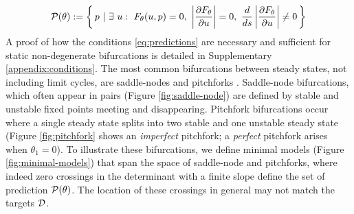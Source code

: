 \documentclass{article}
\begin{document}
\begin{align}
	\mathcal{P}(\theta):=\left\{\,
	p\,\,|\,\,\exists\,\,u:\,\,F_{\theta}(u,p)=0,\,\,\left| \frac{\partial F_{\theta}}{\partial u} \right|=0,
	\,\, \frac{d}{ds}\left| \frac{\partial F_{\theta}}{\partial u} \right|\neq0
	\,\right\}
	\label{eq:predictions}
\end{align}
A proof of how the conditions \eqref{eq:predictions} are necessary and sufficient for static non-degenerate bifurcations is detailed in Supplementary \ref{appendix:conditions}. The most common bifurcations between steady states, not including limit cycles, are saddle-nodes and pitchforks \cite{Haragus2011LocalSystems}. Saddle-node bifurcations, which often appear in pairs (Figure \ref{fig:saddle-node}) are defined by stable and unstable fixed points meeting and disappearing. Pitchfork bifurcations occur where a single steady state splits into two stable and one unstable steady state (Figure \ref{fig:pitchfork} shows an \textit{imperfect} pitchfork; a \textit{perfect} pitchfork arises when $\theta_1=0$). To illustrate these bifurcations, we define minimal models (Figure \ref{fig:minimal-models}) that span the space of saddle-node and pitchforks, where indeed zero crossings in the determinant with a finite slope define the set of prediction $\mathcal{P}(\theta)$. The location of these crossings in general may not match the targets $\mathcal{D}$.
\end{document}
